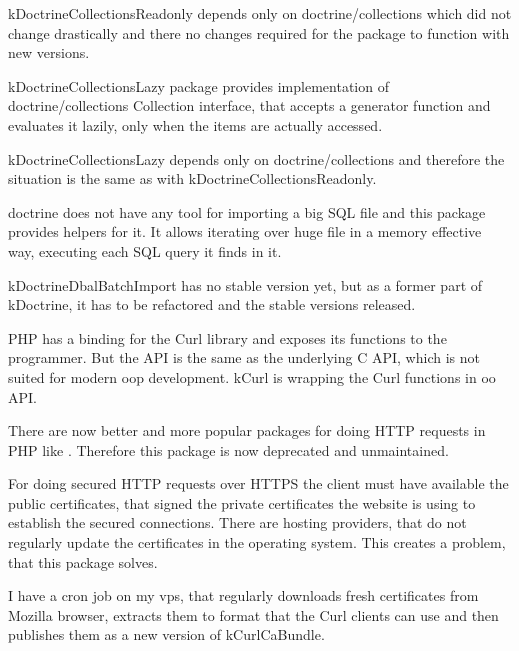 \gls{kDoctrineCollectionsReadonly} depends only on doctrine/collections which did not change drastically and there no changes required for the package to function with new versions.

 \label{sec:state:doctrine-collections-lazy}

\Gls{kDoctrineCollectionsLazy} package provides implementation of doctrine/collections Collection interface, that accepts a generator function and evaluates it lazily, only when the items are actually accessed.

\gls{kDoctrineCollectionsLazy} depends only on doctrine/collections and therefore the situation is the same as with \gls{kDoctrineCollectionsReadonly}.

 \label{sec:state:doctrine-dbal-batch-import}

\Gls{doctrine} does not have any tool for importing a big SQL file and this package provides helpers for it. It allows iterating over huge file in a memory effective way, executing each SQL query it finds in it.

\gls{kDoctrineDbalBatchImport} has no stable version yet, but as a former part of \gls{kDoctrine}, it has to be refactored and the stable versions released.

 \label{sec:state:curl}

PHP has a binding for the Curl library and exposes its functions to the programmer. But the API is the same as the underlying C API, which is not suited for modern \gls{oop} development. \gls{kCurl} is wrapping the Curl functions in \gls{oo} API.

There are now better and more popular packages for doing HTTP requests in PHP like . Therefore this package is now deprecated and unmaintained.

 \label{sec:state:curl-ca-bundle}

For doing secured HTTP requests over HTTPS the client must have available the public certificates, that signed the private certificates the website is using to establish the secured connections. There are hosting providers, that do not regularly update the certificates in the operating system. This creates a problem, that this package solves.

I have a cron job on my \gls{vps}, that regularly downloads fresh certificates from Mozilla browser, extracts them to format that the Curl clients can use and then publishes them as a new version of \gls{kCurlCaBundle}.

